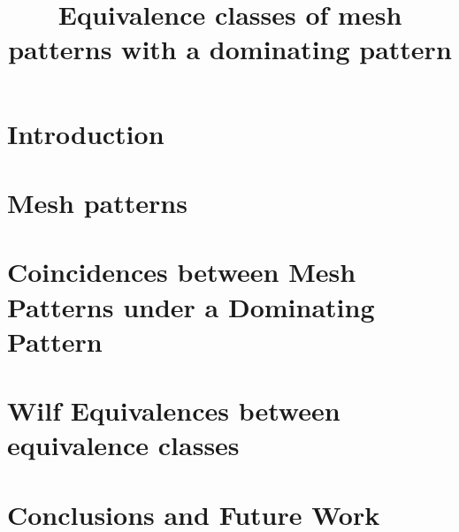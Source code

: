 \documentclass[11pt, a4paper]{amsart}
\title{Equivalence classes of mesh patterns with a dominating pattern}
\begin{document}

\maketitle
\thispagestyle{empty}
\section{Introduction}

\section{Mesh patterns}

\section{Coincidences between Mesh Patterns under a Dominating Pattern}
\label{sec:coincs}

\section{Wilf Equivalences between equivalence classes}

\section{Conclusions and Future Work}


\printbibliography
\end{document}
